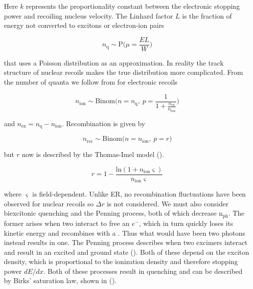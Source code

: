 Here $k$ represents the proportionality constant between the electronic stopping power and recoiling nucleus velocity.  The Linhard factor
$L$ is the fraction of energy not converted to excitons or electron-ion pairs

\begin{equation}
n_{\mathrm{q}} \sim \mathrm{P} \Big( \mu = \frac{E L}{W} \Big)
\end{equation}

\noindent that uses a Poisson distribution as an approximation.  In reality the track structure of nuclear recoils makes the true
distribution more complicated.  From the number of quanta we follow from  for
electronic recoils

\begin{equation}
n_{\mathrm{ion}} \sim \mathrm{Binom} \Bigg(n = n_{\mathrm{q}},\ p = \frac{1}{1 + \frac{n_{\mathrm{ex}}}{n_{\mathrm{ion}}}} \Bigg)
\end{equation}

\noindent and $n_{\mathrm{ex}} = n_{\mathrm{q}} - n_{\mathrm{ion}}$.  Recombination is given by

\begin{equation}
n_{\mathrm{rec}} \sim \mathrm{Binom} \Big(n = n_{\mathrm{ion}},\ p = r \Big)
\end{equation}

\noindent but $r$ now is described by the Thomas-Imel model ().

\begin{equation}
r = 1 - \frac{\mathrm{ln} (1 + n_{\mathrm{ion}} \varsigma)}{n_{\mathrm{ion}} \varsigma}
\end{equation}

\noindent where $\varsigma$ is field-dependent.  Unlike ER, no recombination fluctuations have been observed for nuclear recoils so
$\Delta r$ is not considered.  We must also consider biexcitonic quenching and the Penning process, both of which decrease
$\mathrm{n_{ph}}$.  The former arises when two
 interact to free an $e^-$, which in turn quickly loses its kinetic energy
and recombines with a .  Thus what would have been two photons instead results in one.  The Penning process describes when
two excimers interact and result in an excited and ground state ().  Both of these depend on the exciton density, which
is proportional to the ionization density and therefore stopping power $dE / dx$.  Both of these processes result in quenching and can be
described by Birks' saturation law, shown in  ().

